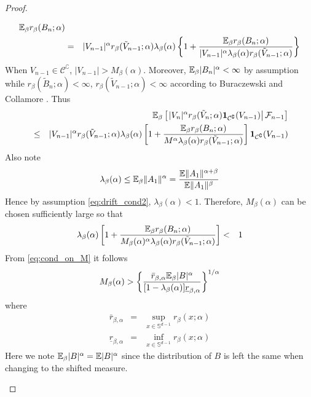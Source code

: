 \documentclass[aoas,preprint]{imsart}
\numberwithin{equation}{section}
\theoremstyle{plain}
\begin{document}
\begin{proof}
\begin{enumerate}
\begin{eqnarray*}
      \mathbb{E}_\beta r_\beta(B_n; \alpha) \\
      &=& |V_{n-1}|^\alpha r_\beta(\tilde V_{n-1}; \alpha) \lambda_\beta(\alpha)
      \left\{
        1 + 
        {\mathbb{E}_\beta r_\beta(B_n; \alpha) \over |V_{n-1}|^\alpha \lambda_\beta(\alpha) r_\beta(\tilde V_{n-1}; \alpha)}
         \right\} \\
    \end{eqnarray*}
    When $V_{n-1} \in \mathcal C^\complement$, $|V_{n-1}| > M_\beta(\alpha)$.
    Moreover, $\mathbb{E}_\beta|B_n|^\alpha < \infty$ by assumption while
    $r_\beta(\tilde B_n; \alpha) < \infty$, $r_\beta(\tilde V_{n-1}; \alpha) < \infty$
    according to Buraczewski and Collamore \cite{BCDZ2014}. Thus
    \begin{eqnarray*}
      && \mathbb{E}_\beta \left[ \left.
          |V_n|^\alpha r_\beta(\tilde V_n; \alpha) \mathbf{1}_{\mathcal C^\complement}(V_{n-1})
        \right| \mathcal F_{n-1}
      \right] \\
      &\leq&
      |V_{n-1}|^\alpha r_\beta(\tilde V_{n-1}; \alpha) \lambda_\beta(\alpha)
      \left[
        1 + 
        {\mathbb{E}_\beta r_\beta(B_n; \alpha) \over M^\alpha \lambda_\beta(\alpha) r_\beta(\tilde V_{n-1}; \alpha)}
      \right]
      \mathbf{1}_{\mathcal C^\complement}(V_{n-1})
    \end{eqnarray*}
    Also note
    \begin{equation*}
      \lambda_\beta(\alpha) \leq \mathbb{E}_\beta \|A_1\|^\alpha = {
        \mathbb{E} \|A_1\|^{\alpha + \beta}
        \over
        \mathbb{E} \|A_1\|^{\beta}
      }
    \end{equation*}
    Hence by assumption \eqref{eq:drift_cond2}, $\lambda_\beta(\alpha)
    < 1$. Therefore, $M_\beta(\alpha)$ can be chosen sufficiently large so that
    \begin{eqnarray}
      \lambda_\beta(\alpha) \left[
        1 +  
        {\mathbb{E}_\beta r_\beta(B_n; \alpha) \over M_\beta(\alpha)^\alpha
          \lambda_\beta(\alpha) r_\beta(\tilde V_{n-1}; \alpha)}
        \right] &<& 1 \label{eq:cond_on_M}
    \end{eqnarray}
    From \eqref{eq:cond_on_M} it follows
    \begin{equation}
      \label{eq:C_set}
      M_\beta(\alpha) > \left\{
        \bar r_{\beta, \alpha}\mathbb{E}_\beta |B|^\alpha
          \over
          [1 - \lambda_\beta(\alpha)] \underline r_{\beta, \alpha}
        \right\}^{1/\alpha}
    \end{equation}
    where
    \begin{eqnarray*}
      \bar r_{\beta, \alpha} &=& \sup_{x \in \mathbb S^{d-1}}
      r_\beta(x; \alpha) \\
      \underline r_{\beta, \alpha} &=& \inf_{x \in \mathbb S^{d-1}}
      r_\beta(x; \alpha)
    \end{eqnarray*}
    Here we note $\mathbb{E}_\beta |B|^\alpha = \mathbb{E} |B|^\alpha$
    since the distribution of $B$ is left the same when
    changing to the shifted measure.


\end{enumerate}
\end{proof}
\end{document}
